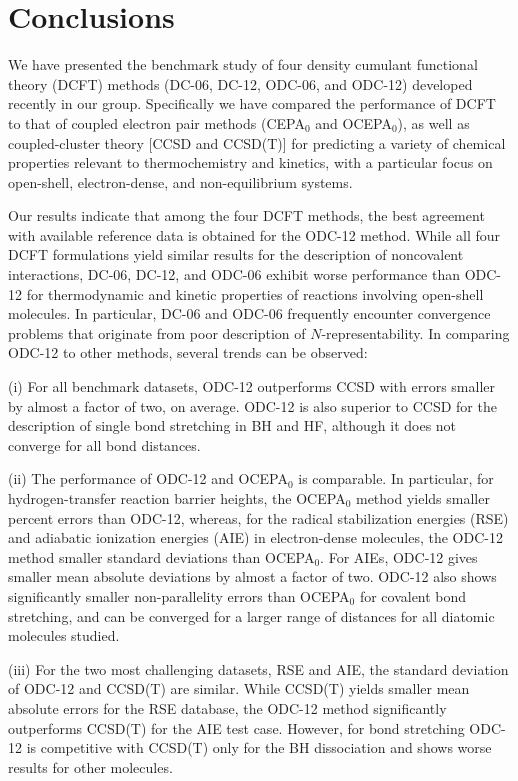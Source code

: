 \section{Conclusions}

We have presented the benchmark study of four density cumulant functional theory
(DCFT) methods (DC-06, DC-12, ODC-06, and ODC-12) developed recently in our
group.\cite{Simmonett:2010p174122,Sokolov:2012p054105,Sokolov:2013p024107,Sokolov:2013p204110}
Specifically we have compared the performance of DCFT to that of coupled
electron pair methods (CEPA$_0$ and OCEPA$_0$), as well as coupled-cluster
theory [CCSD and CCSD(T)] for predicting a variety of chemical properties
relevant to thermochemistry and kinetics, with a particular focus on open-shell,
electron-dense, and non-equilibrium systems.

Our results indicate that among the four DCFT methods, the best agreement with
available reference data is obtained for the ODC-12 method.
While all four DCFT formulations yield similar results for the description of
noncovalent interactions, DC-06, DC-12, and ODC-06 exhibit worse performance
than ODC-12 for thermodynamic and kinetic properties of reactions involving
open-shell molecules.
In particular, DC-06 and ODC-06 frequently encounter convergence problems that
originate from poor description of $N$-representability.
In comparing ODC-12 to other methods, several trends can be observed: 

(i) For all benchmark datasets, ODC-12 outperforms CCSD with errors smaller by
almost a factor of two, on average.
ODC-12 is also superior to CCSD for the description of single bond stretching in
BH and HF, although it does not converge for all bond distances.

(ii) The performance of ODC-12 and OCEPA$_0$ is comparable.
In particular, for hydrogen-transfer reaction barrier heights, the OCEPA$_0$
method yields smaller percent errors than ODC-12, whereas, for the radical
stabilization energies (RSE) and adiabatic ionization energies (AIE) in
electron-dense molecules, the ODC-12 method smaller standard deviations than
OCEPA$_0$.
For AIEs, ODC-12 gives smaller mean absolute deviations by almost a factor of
two.
ODC-12 also shows significantly smaller non-parallelity errors than OCEPA$_0$
for covalent bond stretching, and can be converged for a larger range of
distances for all diatomic molecules studied.

(iii) For the two most challenging datasets, RSE and AIE, the standard deviation
of ODC-12 and CCSD(T) are similar.
While CCSD(T) yields smaller mean absolute errors for the RSE database, the
ODC-12 method significantly outperforms CCSD(T) for the AIE test case.
However, for bond stretching ODC-12 is competitive with CCSD(T) only for the BH
dissociation and shows worse results for other molecules.

